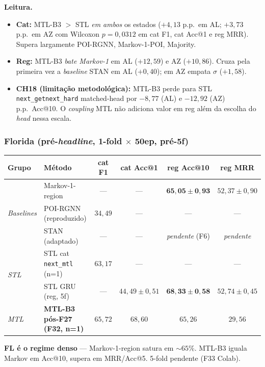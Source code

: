\documentclass[11pt,a4paper]{article}
\begin{document}
\noindent\textbf{Leitura.}
\begin{itemize}[leftmargin=*,noitemsep]
\item \textbf{Cat:} MTL-B3 $>$ STL \emph{em ambos} os estados ($+4{,}13$ p.p.\ em AL; $+3{,}73$ p.p.\ em AZ com Wilcoxon $p=0{,}0312$ em cat F1, cat Acc@1 e reg MRR). Supera largamente POI-RGNN, Markov-1-POI, Majority.
\item \textbf{Reg:} MTL-B3 \emph{bate Markov-1} em AL ($+12{,}59$) e AZ ($+10{,}86$). Cruza pela primeira vez a \textit{baseline} STAN em AL ($+0{,}40$); em AZ empata $\sigma$ ($+1{,}58$).
\item \textbf{CH18 (limitação metodológica):} MTL-B3 perde para STL \texttt{next\_getnext\_hard} matched-head por $-8{,}77$ (AL) e $-12{,}92$ (AZ) p.p.\ Acc@10. O \textit{coupling} MTL não adiciona valor em reg além da escolha do \textit{head} nessa escala.
\end{itemize}

\subsubsection*{Florida (pré-\textit{headline}, 1-fold $\times$ 50ep, pré-5f)}

\begin{table}[H]
\centering
\footnotesize
\begin{tabular}{llcccc}
\toprule
\textbf{Grupo} & \textbf{Método} & \textbf{cat F1} & \textbf{cat Acc@1} & \textbf{reg Acc@10} & \textbf{reg MRR} \\
\midrule
\multirow{3}{*}{\textit{Baselines}} & Markov-1-region & --- & --- & $\mathbf{65{,}05 \pm 0{,}93}$ & $52{,}37 \pm 0{,}90$ \\
& POI-RGNN (reproduzido) & $34{,}49$ & --- & --- & --- \\
& STAN (adaptado) & --- & --- & \textit{pendente} (F6) & \textit{pendente} \\
\multirow{2}{*}{\textit{STL}} & STL cat \texttt{next\_mtl} (n=1) & $63{,}17$ & --- & --- & --- \\
& STL GRU (reg, 5f) & --- & $44{,}49 \pm 0{,}51$ & $\mathbf{68{,}33 \pm 0{,}58}$ & $52{,}74 \pm 0{,}45$ \\
\textit{MTL} & \textbf{MTL-B3 pós-F27 (F32, n=1)} & $65{,}72$ & $68{,}60$ & $65{,}26$ & $29{,}56$ \\
\bottomrule
\end{tabular}
\end{table}

\textbf{FL é o regime denso} --- Markov-1-region satura em $\sim 65$\%. MTL-B3 iguala Markov em Acc@10, supera em MRR/Acc@5. 5-fold pendente (F33 Colab).
\end{document}
